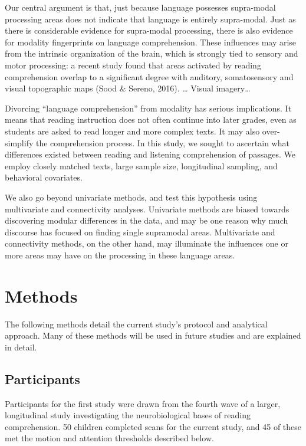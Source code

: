 Our central argument is that, just because language possesses supra-modal processing areas does not indicate that language is entirely supra-modal. Just as there is considerable evidence for supra-modal processing, there is also evidence for modality fingerprints on language comprehension. These influences may arise from the intrinsic organization of the brain, which is strongly tied to sensory and motor processing: a recent study found that areas activated by reading comprehension overlap to a significant degree with auditory, somatosensory and visual topographic maps (Sood \& Sereno, 2016). … Visual imagery… 

Divorcing “language comprehension” from modality has serious implications. It means that reading instruction does not often continue into later grades, even as students are asked to read longer and more complex texts. It may also over-simplify the comprehension process. 
In this study, we sought to ascertain what differences existed between reading and listening comprehension of passages. We employ closely matched texts, large sample size, longitudinal sampling, and behavioral covariates. 

We also go beyond univariate methods, and test this hypothesis using multivariate and connectivity analyses. Univariate methods are biased towards discovering modular differences in the data, and may be one reason why much discourse has focused on finding single supramodal areas. Multivariate and connectivity methods, on the other hand, may illuminate the influences one or more areas may have on the processing in these language areas. 


\section{Methods}

The following methods detail the current study's protocol and analytical approach. Many of these methods will be used in future studies and are explained in detail. 

\subsection{Participants}

Participants for the first study were drawn from the fourth wave of a larger, longitudinal study investigating the neurobiological bases of reading comprehension. 50 children completed scans for the current study, and 45 of these met the motion and attention thresholds described below. 

